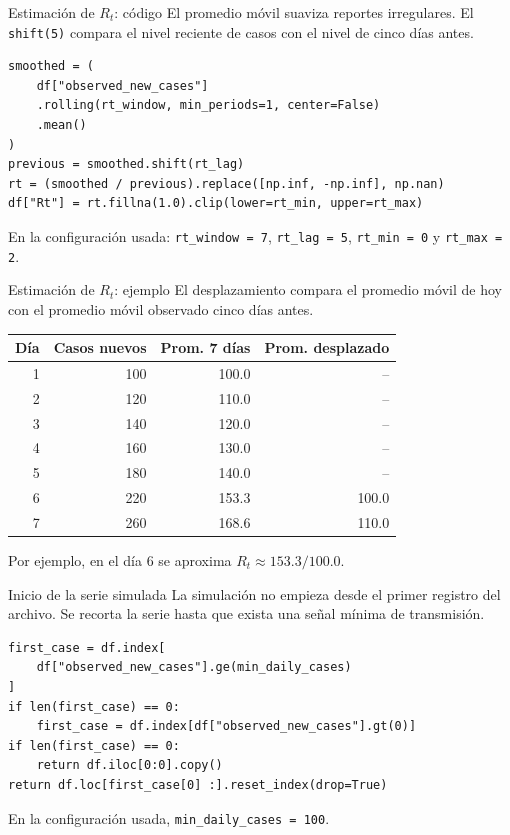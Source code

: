 \documentclass[aspectratio=169]{beamer}
\begin{document}
\begin{frame}[fragile]{Estimación de \(R_t\): código}
  \small
  El promedio móvil suaviza reportes irregulares. El \texttt{shift(5)}
  compara el nivel reciente de casos con el nivel de cinco días antes.

  \vspace{0.2cm}

  \scriptsize
  \begin{verbatim}
smoothed = (
    df["observed_new_cases"]
    .rolling(rt_window, min_periods=1, center=False)
    .mean()
)
previous = smoothed.shift(rt_lag)
rt = (smoothed / previous).replace([np.inf, -np.inf], np.nan)
df["Rt"] = rt.fillna(1.0).clip(lower=rt_min, upper=rt_max)
  \end{verbatim}

  \normalsize
  En la configuración usada: \texttt{rt\_window = 7},
  \texttt{rt\_lag = 5}, \texttt{rt\_min = 0} y \texttt{rt\_max = 2}.
\end{frame}

\begin{frame}{Estimación de \(R_t\): ejemplo}
  \small
  El desplazamiento compara el promedio móvil de hoy con el promedio móvil
  observado cinco días antes.

  \begin{table}
    \centering
    \begin{tabular}{rrrr}
      \toprule
      Día & Casos nuevos & Prom. 7 días & Prom. desplazado \\
      \midrule
      1 & 100 & 100.0 & -- \\
      2 & 120 & 110.0 & -- \\
      3 & 140 & 120.0 & -- \\
      4 & 160 & 130.0 & -- \\
      5 & 180 & 140.0 & -- \\
      6 & 220 & 153.3 & 100.0 \\
      7 & 260 & 168.6 & 110.0 \\
      \bottomrule
    \end{tabular}
  \end{table}

  Por ejemplo, en el día 6 se aproxima \(R_t \approx 153.3 / 100.0\).
\end{frame}

\begin{frame}[fragile]{Inicio de la serie simulada}
  \small
  La simulación no empieza desde el primer registro del archivo. Se recorta la
  serie hasta que exista una señal mínima de transmisión.

  \vspace{0.3cm}

  \scriptsize
  \begin{verbatim}
first_case = df.index[
    df["observed_new_cases"].ge(min_daily_cases)
]
if len(first_case) == 0:
    first_case = df.index[df["observed_new_cases"].gt(0)]
if len(first_case) == 0:
    return df.iloc[0:0].copy()
return df.loc[first_case[0] :].reset_index(drop=True)
  \end{verbatim}

  \normalsize
  En la configuración usada, \texttt{min\_daily\_cases = 100}.
\end{frame}
\end{document}
